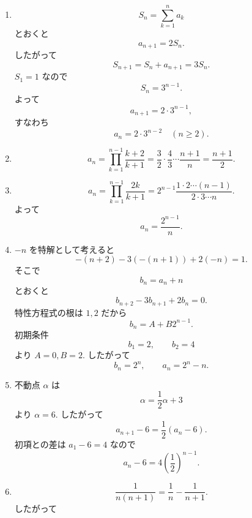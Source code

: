 \begin{enumerate}[label=\textbf{問\arabic*.},leftmargin=3.8em,format=\bookitemlink{practice-basic}{solution}{problem}]
\[            b_{n+1}=1+2b_n,
            \qquad b_1=0.
          \]
              不動点 \(-1\) を用いれば
          \[
            b_{n+1}+1=2(b_n+1).
          \]
              よって
          \[
            b_n+1=2^{n-1}
          \]
              なので
          \[
            b_n=2^{n-1}-1.
          \]
              したがって
          \[
            a_n=2^{2^{n-1}-1}.
          \]
        \item \[
            S_n=\sum_{k=1}^{n}a_k
          \]
              とおくと
          \[
            a_{n+1}=2S_n.
          \]
              したがって
          \[
            S_{n+1}=S_n+a_{n+1}=3S_n.
          \]
              \(S_1=1\) なので
          \[
            S_n=3^{n-1}.
          \]
              よって
          \[
            a_{n+1}=2\cdot3^{n-1},
          \]
              すなわち
          \[
            a_n=2\cdot3^{n-2}\quad(n\ge2).
          \]
        \item \[
            a_n
            =\prod_{k=1}^{n-1}\frac{k+2}{k+1}
            =\frac32\cdot\frac43\cdots\frac{n+1}{n}
            =\frac{n+1}{2}.
          \]
        \item \[
            a_n
            =\prod_{k=1}^{n-1}\frac{2k}{k+1}
            =2^{n-1}\frac{1\cdot2\cdots(n-1)}{2\cdot3\cdots n}.
          \]
              よって
          \[
            a_n=\frac{2^{n-1}}n.
          \]
        \item \(-n\) を特解として考えると
          \[
            -(n+2)-3(-(n+1))+2(-n)=1.
          \]
              そこで
          \[
            b_n=a_n+n
          \]
              とおくと
          \[
            b_{n+2}-3b_{n+1}+2b_n=0.
          \]
              特性方程式の根は \(1,2\) だから
          \[
            b_n=A+B2^{n-1}.
          \]
              初期条件
          \[
            b_1=2,\qquad b_2=4
          \]
              より \(A=0,B=2\).
              したがって
          \[
            b_n=2^n,
            \qquad
            a_n=2^n-n.
          \]
        \item 不動点 \(\alpha\) は
          \[
            \alpha=\frac12\alpha+3
          \]
              より \(\alpha=6\).
              したがって
          \[
            a_{n+1}-6
            =\frac12(a_n-6).
          \]
              初項との差は \(a_1-6=4\) なので
          \[
            a_n-6
            =4\left(\frac12\right)^{n-1}.
          \]
        \item \[
            \frac1{n(n+1)}
            =\frac1n-\frac1{n+1}.
          \]
              したがって
          \[
\]
\end{enumerate}
